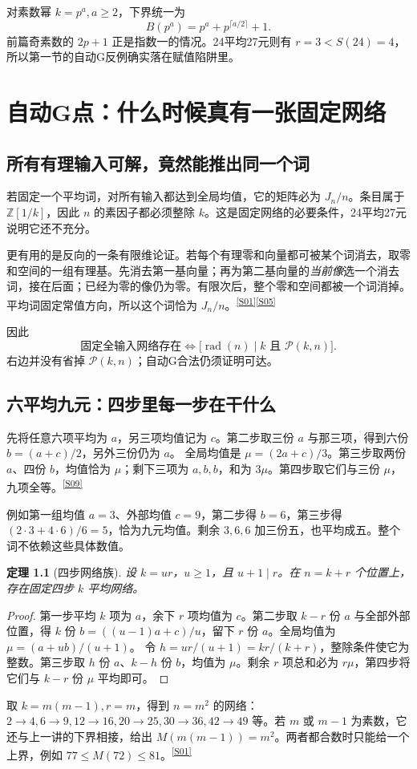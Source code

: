 \documentclass[11pt,a4paper,oneside,openany]{book}
\newcommand{\Z}{\mathbb Z}\newcommand{\Q}{\mathbb Q}\newcommand{\F}{\mathbb F}\newcommand{\CC}{\mathbb C}
\newcommand{\rad}{\operatorname{rad}}\newcommand{\diag}{\operatorname{diag}}
\newcommand{\src}[1]{\textsuperscript{\hyperref[source:#1]{[#1]}}}
\newtheorem{theorem}{定理}[chapter]
\theoremstyle{definition}\newtheorem{example}[theorem]{例}\newtheorem{conjecture}[theorem]{猜想}
\numberwithin{equation}{chapter}\setcounter{tocdepth}{1}
\begin{document}
对素数幂 $k=p^a,a\ge2$，下界统一为
\[B(p^a)=p^a+p^{\lceil a/2\rceil}+1.
\]
前篇奇素数的 $2p+1$ 正是指数一的情况。24平均27元则有 $r=3<S(24)=4$，所以第一节的自动G反例确实落在赋值陷阱里。


\chapter{自动G点：什么时候真有一张固定网络}\label{ch:networks}
\section{所有有理输入可解，竟然能推出同一个词}
若固定一个平均词，对所有输入都达到全局均值，它的矩阵必为 $J_n/n$。条目属于 $\Z[1/k]$，因此 $n$ 的素因子都必须整除 $k$。这是固定网络的必要条件，24平均27元说明它还不充分。

更有用的是反向的一条有限维论证。若每个有理零和向量都可被某个词消去，取零和空间的一组有理基。先消去第一基向量；再为第二基向量的\emph{当前像}选一个消去词，接在后面；已经为零的像仍为零。有限次后，整个零和空间都被一个词消掉。平均词固定常值方向，所以这个词恰为 $J_n/n$。\src{S01}\src{S05}

因此
\[
\text{固定全输入网络存在}
\iff\bigl[\rad(n)\mid k\text{ 且 }\mathcal P(k,n)\bigr].
\]
右边并没有省掉 $\mathcal P(k,n)$；自动G合法仍须证明可达。

\section{六平均九元：四步里每一步在干什么}
先将任意六项平均为 $a$，另三项均值记为 $c$。第二步取三份 $a$ 与那三项，得到六份 $b=(a+c)/2$，另外三份仍为 $a$。
全局均值是 $\mu=(2a+c)/3$。第三步取两份 $a$、四份 $b$，均值恰为 $\mu$；剩下三项为 $a,b,b$，和为 $3\mu$。第四步取它们与三份 $\mu$，九项全等。\src{S09}

例如第一组均值 $a=3$、外部均值 $c=9$，第二步得 $b=6$，第三步得 $(2\cdot3+4\cdot6)/6=5$，恰为九元均值。剩余 $3,6,6$ 加三份五，也平均成五。整个词不依赖这些具体数值。

\begin{theorem}[四步网络族]\label{thm:four-network}
设 $k=ur$，$u\ge1$，且 $u+1\mid r$。在 $n=k+r$ 个位置上，存在固定四步 $k$ 平均网络。
\end{theorem}
\begin{proof}
第一步平均 $k$ 项为 $a$，余下 $r$ 项均值为 $c$。第二步取 $k-r$ 份 $a$ 与全部外部位置，得 $k$ 份 $b=((u-1)a+c)/u$，留下 $r$ 份 $a$。全局均值为 $\mu=(a+ub)/(u+1)$。
令 $h=ur/(u+1)=kr/(k+r)$，整除条件使它为整数。第三步取 $h$ 份 $a$、$k-h$ 份 $b$，均值为 $\mu$。剩余 $r$ 项总和必为 $r\mu$，第四步将它们与 $k-r$ 份 $\mu$ 平均即可。
\end{proof}
取 $k=m(m-1),r=m$，得到 $n=m^2$ 的网络：$2\to4,6\to9,12\to16,20\to25,30\to36,42\to49$ 等。若 $m$ 或 $m-1$ 为素数，它还与上一讲的下界相接，给出 $M(m(m-1))=m^2$。两者都合数时只能给一个上界，例如 $77\le M(72)\le81$。\src{S01}
\end{document}
